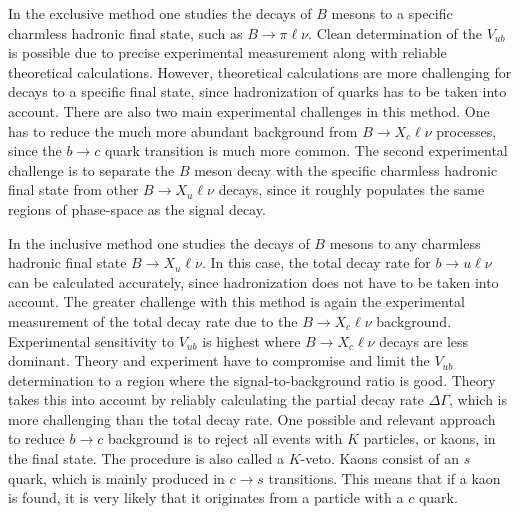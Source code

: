\documentclass[  headings=standardclasses,
  headings=big,oneside,a4paper,openany,12pt]{scrbook}
\begin{document}
In the exclusive method one studies the decays of $B$ mesons to a specific charmless hadronic final state, such as $B \rightarrow \pi \ell \nu$. Clean determination of the $V_{ub}$ is possible due to precise experimental measurement along with reliable theoretical calculations. However, theoretical calculations are more challenging for decays to a specific final state, since hadronization of quarks has to be taken into account. There are also two main experimental challenges in this method. One has to reduce the much more abundant background from $B \rightarrow X_c \ell \nu$ processes, since the $b \rightarrow c$ quark transition is much more common. The second experimental challenge is to separate the $B$ meson decay with the specific charmless hadronic final state from other $B \rightarrow X_u \ell \nu$ decays, since it roughly populates the same regions of phase-space as the signal decay.

In the inclusive method one studies the decays of $B$ mesons to any charmless hadronic final state $B \to X_u \ell \nu$. In this case, the total decay rate for $b \rightarrow u \ell \nu$ can be calculated accurately, since hadronization does not have to be taken into account. The greater challenge with this method is again the experimental measurement of the total decay rate due to the $B \rightarrow X_c \ell \nu$ background. Experimental sensitivity to $V_{ub}$ is highest where $B \rightarrow X_c \ell \nu$ decays are less dominant. Theory and experiment have to compromise and limit the $V_{ub}$ determination to a region where the signal-to-background ratio is good. Theory takes this into account by reliably calculating the partial decay rate $\Delta \Gamma$, which is more challenging than the total decay rate. One possible and relevant approach to reduce $b \rightarrow c$ background is to reject all events with $K$ particles, or kaons, in the final state. The procedure is also called a $K$-veto. Kaons consist of an $s$ quark, which is mainly produced in $c \rightarrow s$ transitions. This means that if a kaon is found, it is very likely that it originates from a particle with a $c$ quark. 
\end{document}
